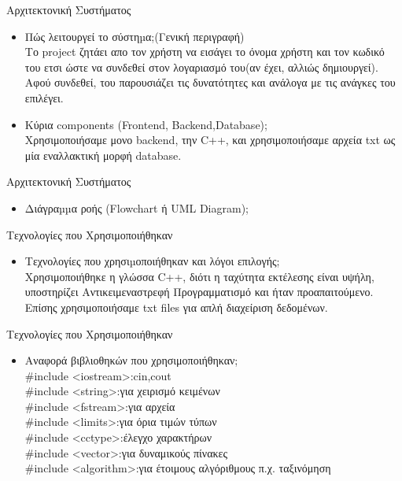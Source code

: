 \documentclass{beamer}
\begin{document}
\begin{frame}{Αρχιτεκτονική Συστήματος}
\begin{itemize}
  \item Πώς λειτουργεί το σύστηµα;(Γενική περιγραφή)
  \vspace{0.2cm}
  \\ Το project ζητάει απο τον χρήστη να εισάγει το όνομα χρήστη και τον κωδικό του ετσι ώστε να συνδεθεί στον λογαριασμό του(αν έχει, αλλιώς δημιουργεί). Αφού συνδεθεί, του παρουσιάζει τις δυνατότητες και ανάλογα με τις ανάγκες του επιλέγει.
  \vspace{0.5cm}
  \item Κύρια components (Frontend, Backend,Database);
  \vspace{0.2cm}
  \\ Χρησιμοποιήσαμε μονο backend, την C++, και χρησιμοποιήσαμε αρχεία txt ως μία εναλλακτική μορφή database.
\end{itemize}
\end{frame}

\begin{frame}{Αρχιτεκτονική Συστήματος}
\begin{itemize}
  \item Διάγραµµα ροής (Flowchart ή UML Diagram);
   \vspace{0.2cm}
   \\
\end{itemize}
\end{frame}

\begin{frame}{Τεχνολογίες που Χρησιμοποιήθηκαν}
\begin{itemize}
  \item Τεχνολογίες που χρησιµοποιήθηκαν και λόγοι επιλογής;
  \vspace{0.2cm}
  \\ Χρησιμοποιήθηκε η γλώσσα C++, διότι η ταχύτητα εκτέλεσης είναι υψήλη, υποστηρίζει Αντικειμεναστρεφή Προγραμματισμό και ήταν προαπαιτούμενο. Επίσης χρησιμοποιήσαμε txt files για απλή διαχείριση δεδομένων.
\end{itemize}
\end{frame}

\begin{frame}{Τεχνολογίες που Χρησιμοποιήθηκαν}
\begin{itemize}
  
  \item Αναφορά βιβλιοθηκών που χρησιμοποιήθηκαν;
  \vspace{0.2cm}
  \\#include <iostream>:cin,cout
\\#include <string>:για χειρισμό κειμένων
\\#include <fstream>:για αρχεία
\\#include <limits>:για όρια τιμών τύπων
\\#include <cctype>:έλεγχο χαρακτήρων
\\#include <vector>:για δυναμικούς πίνακες
\\#include <algorithm>:για έτοιμους αλγόριθμους π.χ. ταξινόμηση
\end{itemize}
\end{frame}
\end{document}
